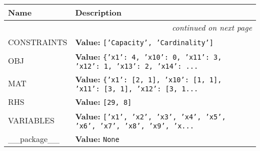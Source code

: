     \vspace{-1cm}
\hspace{\varindent}\begin{longtable}{|p{\varnamewidth}|p{\vardescrwidth}|l}
\cline{1-2}
\cline{1-2} \centering \textbf{Name} & \centering \textbf{Description}& \\
\cline{1-2}
\endhead\cline{1-2}\multicolumn{3}{r}{\small\textit{continued on next page}}\\\endfoot\cline{1-2}
\endlastfoot\raggedright C\-O\-N\-S\-T\-R\-A\-I\-N\-T\-S\- & \raggedright \textbf{Value:} 
{\tt \texttt{[}\texttt{'}\texttt{Capacity}\texttt{'}\texttt{, }\texttt{'}\texttt{Cardinality}\texttt{'}\texttt{]}}&\\
\cline{1-2}
\raggedright O\-B\-J\- & \raggedright \textbf{Value:} 
{\tt \texttt{\{}\texttt{'}\texttt{x1}\texttt{'}\texttt{: }4\texttt{, }\texttt{'}\texttt{x10}\texttt{'}\texttt{: }0\texttt{, }\texttt{'}\texttt{x11}\texttt{'}\texttt{: }3\texttt{, }\texttt{'}\texttt{x12}\texttt{'}\texttt{: }1\texttt{, }\texttt{'}\texttt{x13}\texttt{'}\texttt{: }2\texttt{, }\texttt{'}\texttt{x14}\texttt{'}\texttt{: }\texttt{...}}&\\
\cline{1-2}
\raggedright M\-A\-T\- & \raggedright \textbf{Value:} 
{\tt \texttt{\{}\texttt{'}\texttt{x1}\texttt{'}\texttt{: }\texttt{[}2\texttt{, }1\texttt{]}\texttt{, }\texttt{'}\texttt{x10}\texttt{'}\texttt{: }\texttt{[}1\texttt{, }1\texttt{]}\texttt{, }\texttt{'}\texttt{x11}\texttt{'}\texttt{: }\texttt{[}3\texttt{, }1\texttt{]}\texttt{, }\texttt{'}\texttt{x12}\texttt{'}\texttt{: }\texttt{[}3\texttt{, }1\texttt{...}}&\\
\cline{1-2}
\raggedright R\-H\-S\- & \raggedright \textbf{Value:} 
{\tt \texttt{[}29\texttt{, }8\texttt{]}}&\\
\cline{1-2}
\raggedright V\-A\-R\-I\-A\-B\-L\-E\-S\- & \raggedright \textbf{Value:} 
{\tt \texttt{[}\texttt{'}\texttt{x1}\texttt{'}\texttt{, }\texttt{'}\texttt{x2}\texttt{'}\texttt{, }\texttt{'}\texttt{x3}\texttt{'}\texttt{, }\texttt{'}\texttt{x4}\texttt{'}\texttt{, }\texttt{'}\texttt{x5}\texttt{'}\texttt{, }\texttt{'}\texttt{x6}\texttt{'}\texttt{, }\texttt{'}\texttt{x7}\texttt{'}\texttt{, }\texttt{'}\texttt{x8}\texttt{'}\texttt{, }\texttt{'}\texttt{x9}\texttt{'}\texttt{, }\texttt{'}\texttt{x}\texttt{...}}&\\
\cline{1-2}
\raggedright \_\-\_\-p\-a\-c\-k\-a\-g\-e\-\_\-\_\- & \raggedright \textbf{Value:} 
{\tt None}&\\
\cline{1-2}
\end{longtable}

